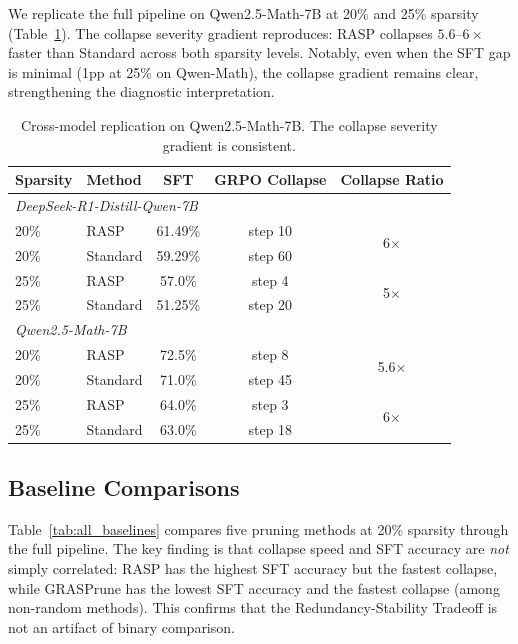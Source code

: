 \documentclass[11pt]{article}
\begin{document}
We replicate the full pipeline on Qwen2.5-Math-7B at 20\% and 25\% sparsity (Table~\ref{tab:cross_model}).
The collapse severity gradient reproduces: RASP collapses $5.6$--$6\times$ faster than Standard across both sparsity levels.
Notably, even when the SFT gap is minimal (1pp at 25\% on Qwen-Math), the collapse gradient remains clear, strengthening the diagnostic interpretation.

\begin{table}[t]
\centering
\caption{Cross-model replication on Qwen2.5-Math-7B. The collapse severity gradient is consistent.}
\label{tab:cross_model}
\begin{tabular}{llccc}
\toprule
\textbf{Sparsity} & \textbf{Method} & \textbf{SFT} & \textbf{GRPO Collapse} & \textbf{Collapse Ratio} \\
\midrule
\multicolumn{5}{l}{\emph{DeepSeek-R1-Distill-Qwen-7B}} \\
\midrule
20\% & RASP     & 61.49\% & step 10 & \multirow{2}{*}{6$\times$} \\
20\% & Standard & 59.29\% & step 60 & \\
25\% & RASP     & 57.0\%  & step 4  & \multirow{2}{*}{5$\times$} \\
25\% & Standard & 51.25\% & step 20 & \\
\midrule
\multicolumn{5}{l}{\emph{Qwen2.5-Math-7B}} \\
\midrule
20\% & RASP     & 72.5\%  & step 8  & \multirow{2}{*}{5.6$\times$} \\
20\% & Standard & 71.0\%  & step 45 & \\
25\% & RASP     & 64.0\%  & step 3  & \multirow{2}{*}{6$\times$} \\
25\% & Standard & 63.0\%  & step 18 & \\
\bottomrule
\end{tabular}
\end{table}

\subsection{Baseline Comparisons}
\label{sec:baselines}

Table~\ref{tab:all_baselines} compares five pruning methods at 20\% sparsity through the full pipeline.
The key finding is that collapse speed and SFT accuracy are \emph{not} simply correlated: RASP has the highest SFT accuracy but the fastest collapse, while GRASPrune has the lowest SFT accuracy and the fastest collapse (among non-random methods).
This confirms that the Redundancy-Stability Tradeoff is not an artifact of binary comparison.
\end{document}
